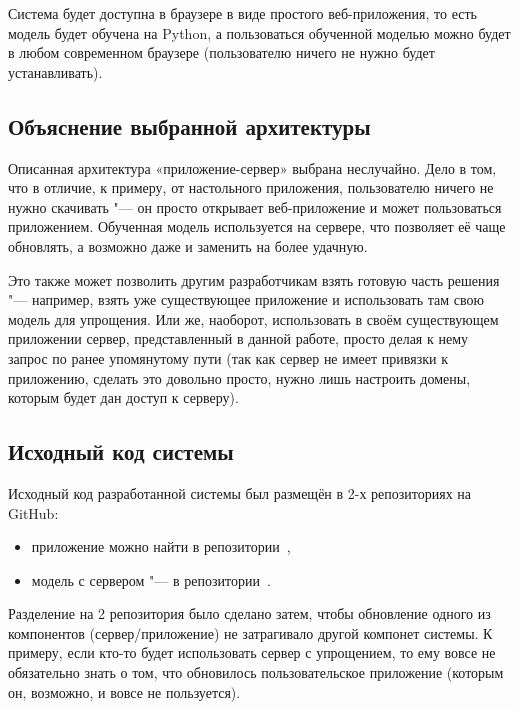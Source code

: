 Система будет доступна в браузере в виде простого веб-приложения, то есть модель будет обучена на Python, а пользоваться обученной моделью можно будет в любом современном браузере (пользователю ничего не нужно будет устанавливать).


\subsection{Объяснение выбранной архитектуры}


Описанная архитектура «приложение-сервер» выбрана неслучайно. Дело в том, что в отличие, к примеру, от настольного приложения, пользователю ничего не нужно скачивать "--- он просто открывает веб-приложение и может пользоваться приложением. Обученная модель используется на сервере, что позволяет её чаще обновлять, а возможно даже и заменить на более удачную.

Это также может позволить другим разработчикам взять готовую часть решения "--- например, взять уже существующее приложение и использовать там свою модель для упрощения. Или же, наоборот, использовать в своём существующем приложении сервер, представленный в данной работе, просто делая к нему запрос по ранее упомянутому пути (так как сервер не имеет привязки к приложению, сделать это довольно просто, нужно лишь настроить домены, которым будет дан доступ к серверу).


\subsection{Исходный код системы}


Исходный код разработанной системы был размещён в 2-х репозиториях на GitHub:
\begin{itemize}%
  \item приложение можно найти в репозитории~\cite{AppGithub},
  \item модель с сервером "--- в репозитории~\cite{ServerGithub}.
\end{itemize}

Разделение на 2 репозитория было сделано затем, чтобы обновление одного из компонентов (сервер/приложение) не затрагивало другой компонет системы.
К примеру, если кто-то будет использовать сервер с упрощением, то ему вовсе не обязательно знать о том, что обновилось пользовательское приложение (которым он, возможно, и вовсе не пользуется).


